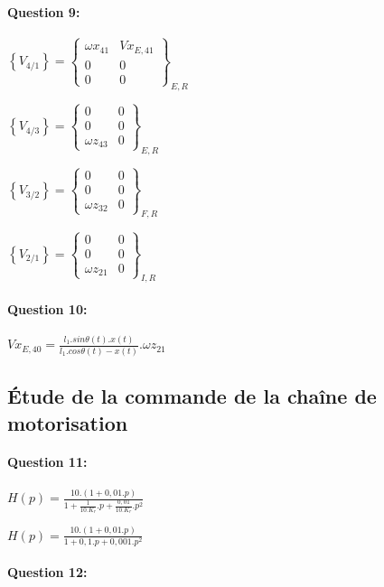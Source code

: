 \paragraph{Question 9:}

$\left\{V_{4/1}\right\}=\left\{
\begin{matrix}
\omega x_{41} & Vx_{E,41} \\
0 & 0 \\
0 & 0 
\end{matrix}
\right \}_{E,R}$

$\left\{V_{4/3}\right\}=\left\{
\begin{matrix}
0 & 0 \\
0 & 0 \\
\omega z_{43} & 0 
\end{matrix}
\right \}_{E,R}$

$\left\{V_{3/2}\right\}=\left\{
\begin{matrix}
0 & 0 \\
0 & 0 \\
\omega z_{32} & 0 
\end{matrix}
\right \}_{F,R}$

$\left\{V_{2/1}\right\}=\left\{
\begin{matrix}
0 & 0 \\
0 & 0 \\
\omega z_{21} & 0 
\end{matrix}
\right \}_{I,R}$

\paragraph{Question 10:}

$Vx_{E,40}=\frac{l_1.sin\theta(t).x(t)}{l_1.cos\theta(t)-x(t)}.\omega z_{21}$


\subsection{Étude de la commande de la chaîne de motorisation}

\paragraph{Question 11:}

$H(p)=\frac{10.(1+0,01.p)}{1+\frac{1}{10.K_r}.p+\frac{0,01}{10.K_r}.p^2}$

$H(p)=\frac{10.(1+0,01.p)}{1+0,1.p+0,001.p^2}$

\paragraph{Question 12:}

